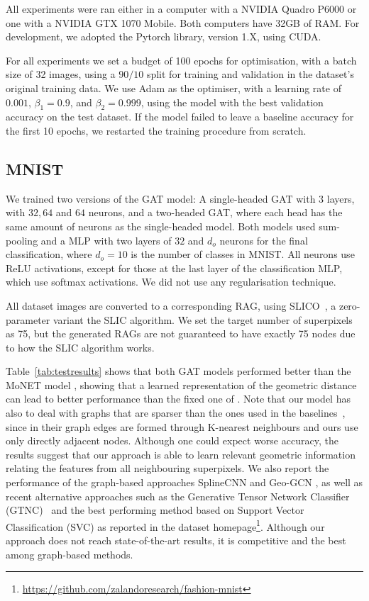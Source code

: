 \documentclass[twocolumn]{article}
\begin{document}
All experiments were ran either in a computer with a NVIDIA Quadro P6000 or one with a NVIDIA GTX 1070 Mobile. Both computers have 32GB of RAM. For development, we adopted the Pytorch library, version 1.X, using CUDA.

For all experiments we set a budget of 100 epochs for optimisation, with a batch size of 32 images, using a $90/10$ split for training and validation in the dataset's original training data. We use Adam as the optimiser, with a learning rate of $0.001$, $\beta_1 = 0.9$, and $\beta_2 = 0.999$, using the model with the best validation accuracy on the test dataset. If the model failed to leave a baseline accuracy for the first 10 epochs, we restarted the training procedure from scratch.

\subsection{MNIST}\label{ssec:mnist}

We trained two versions of the GAT model: A single-headed GAT with $3$ layers, with $32, 64$ and $64$ neurons, and a two-headed GAT, where each head has the same amount of neurons as the single-headed model. Both models used sum-pooling and a MLP with two layers of $32$ and $d_o$ neurons for the final classification, where $d_o = 10$ is the number of classes in  MNIST. All neurons use ReLU activations, except for those at the last layer of the classification MLP, which use softmax activations. We did not use any regularisation technique.

All dataset images are converted to a corresponding RAG, using SLICO~\cite{slico}, a zero-parameter variant the SLIC algorithm. We set the target number of 
superpixels as 75, but the generated RAGs are not guaranteed to have exactly 75 nodes 
due to how the SLIC algorithm works.

Table~\ref{tab:testresults} shows that both 
GAT models performed better than the MoNET model \cite{monti2017monet}, showing that a learned representation of the geometric distance can lead to better performance than the fixed one of \cite{monti2017monet}. Note that our model has also to deal with graphs that are sparser than the ones used in the baselines~\cite{monti2017monet,fey2018splinecnn,spurek2019geogcn}, since in their graph edges are formed through K-nearest neighbours and ours use only directly adjacent nodes. Although one could expect worse accuracy, the results suggest that our approach is able to learn relevant geometric information relating the features from all neighbouring superpixels. We also report the performance of the graph-based approaches  SplineCNN \cite{fey2018splinecnn} and Geo-GCN \cite{spurek2019geogcn}, as well as recent alternative approaches such as the Generative Tensor Network Classifier (GTNC)~\cite{sun2020generative} and the best performing method based on Support Vector Classification (SVC) as reported in the dataset homepage\footnote{\url{https://github.com/zalandoresearch/fashion-mnist}}. Although our approach does not reach state-of-the-art results, it is competitive and the best among graph-based methods.
\end{document}
